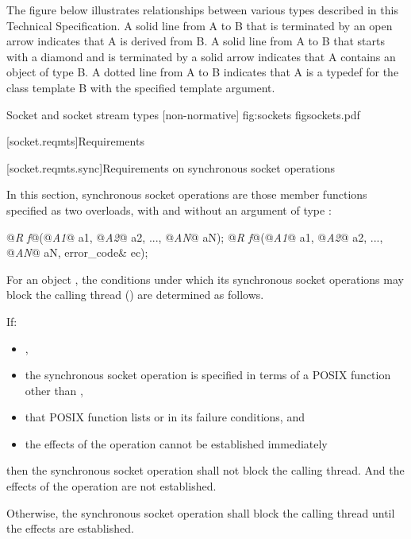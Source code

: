 \pnum
The figure below illustrates relationships between various types described in this Technical Specification. A solid line from A to B that is terminated by an open arrow indicates that A is derived from B. A solid line from A to B that starts with a diamond and is terminated by a solid arrow indicates that A contains an object of type B. A dotted line from A to B indicates that A is a typedef for the class template B with the specified template argument.

\begin{importgraphic}
{Socket and socket stream types [non-normative]}
{fig:sockets}
{figsockets.pdf}
\end{importgraphic}



[socket.reqmts]{Requirements}


[socket.reqmts.sync]{Requirements on synchronous socket operations}

\pnum
In this section, synchronous socket operations are those member functions specified as two overloads, with and without an argument of type :

\begin{codeblock}
@\textit{R f}@(@\textit{A1}@ a1, @\textit{A2}@ a2, ..., @\textit{AN}@ aN);
@\textit{R f}@(@\textit{A1}@ a1, @\textit{A2}@ a2, ..., @\textit{AN}@ aN, error_code& ec);
\end{codeblock}

\pnum
For an object , the conditions under which its synchronous socket operations may block the calling thread () are determined as follows.

\pnum
If:

\begin{itemize}
\item
{},
\item
the synchronous socket operation is specified in terms of a POSIX function other than ,
\item
that POSIX function lists  or  in its failure conditions, and
\item
the effects of the operation cannot be established immediately
\end{itemize}

then the synchronous socket operation shall not block the calling thread. \enternote And the effects of the operation are not established. \exitnote

\pnum
Otherwise, the synchronous socket operation shall block the calling thread until the effects are established.



